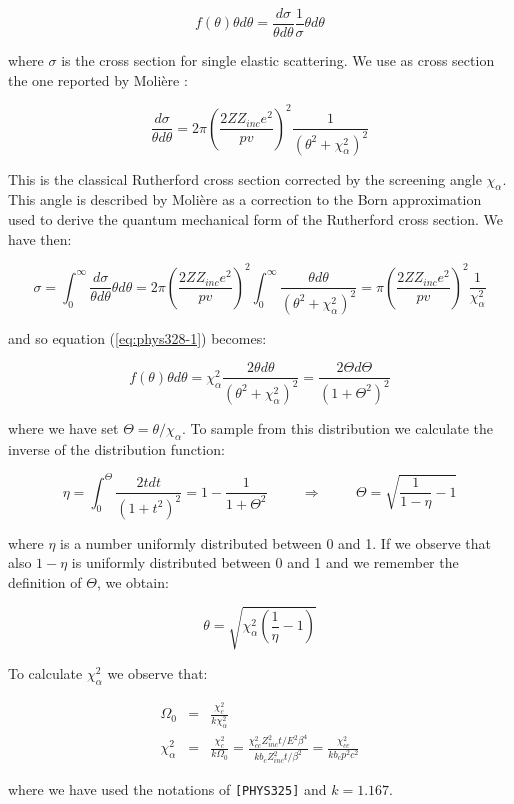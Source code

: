 \begin{equation}
\label{eq:phys328-1}
f(\theta) \theta d\theta = \frac{d \sigma}{\theta d\theta} \frac{1}
{\sigma} \theta d\theta
\end{equation}

where $\sigma$ is the cross section for single elastic scattering.
We use as cross section the one reported by Moli\`{e}re \cite{bib-MOLI}
\cite{bib-MOL1}:

\[
\frac{d \sigma}{\theta d\theta} = 2 \pi \left ( \frac{2 Z Z_{inc}
e^2}{p v} \right ) ^2 \frac{1}{(\theta^2 + \chi_{\alpha}^2)^2}
\]

This is the classical Rutherford cross section corrected by the
screening angle $\chi_{\alpha}$. This angle is described by Moli\`{e}re
as a correction to the Born approximation used to derive the
quantum mechanical form of the Rutherford cross section. We have then:

\[
\sigma = \int_{0}^{\infty}{\frac{d \sigma}{\theta d\theta} \theta d\theta}
= 2 \pi \left ( \frac{2 Z Z_{inc}e^2}{p v} \right ) ^2
\int_{0}^{\infty}{\frac{\theta d \theta}{(\theta^2 + \chi_{\alpha}^2)^2}} =
\pi \left ( \frac{2 Z Z_{inc}e^2}{p v} \right ) ^2 
\frac{1}{\chi_{\alpha}^2}
\]

and so equation (\ref{eq:phys328-1}) becomes:

\[
f(\theta) \theta d\theta = \chi_{\alpha}^2 \frac{2 \theta d \theta}
{(\theta^2 + \chi_{\alpha}^2)^2} = \frac{ 2 \Theta d \Theta}{(1+\Theta^2)^2}
\]

where we have set $\Theta = \theta / \chi_{\alpha}$. To sample from this
distribution we calculate the inverse of the distribution function:

\[
\eta = \int_{0}^{\Theta}{\frac{2 t d t}{(1+t^2)^2}} 
 =  1 - \frac{1}{1+\Theta^2} \hspace{1cm} \Rightarrow \hspace{1cm}
\Theta = \sqrt{\frac{1}{1-\eta}-1}
\]

where $\eta$ is a number uniformly distributed between 0 and 1. If we
observe that also $1-\eta$ is uniformly distributed between 0 and 1 and
we remember the definition of $\Theta$, we obtain:

\[
\theta = \sqrt{\chi_{\alpha}^2 \left (\frac{1}{\eta}-1 \right)}
\]

To calculate $\chi_{\alpha}^2$ we observe that:

\begin{eqnarray*}
\Omega_0 & = & \frac{\chi_{c}^2}{k \chi_{\alpha}^2} \\
\chi_{\alpha}^2 & = & \frac{\chi_{c}^2}{k \Omega_0} =
\frac{\chi_{cc}^2 Z_{inc}^2 t/E^2\beta^4}{k b_{c} Z_{inc}^2 t /\beta^2} =
\frac{\chi_{cc}^2}{k b_{c} p^2 c^2}
\end{eqnarray*}

where we have used the notations of {\tt [PHYS325]} and 
$k = 1.167$.

